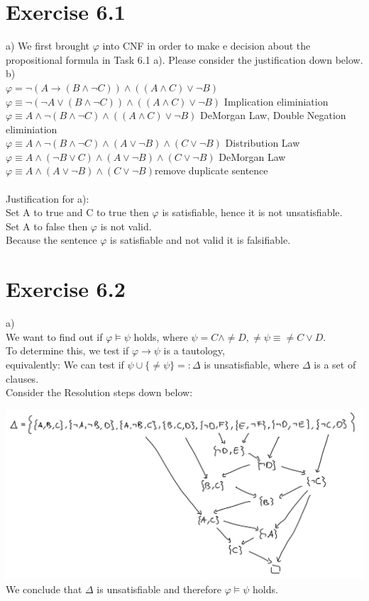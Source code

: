 \documentclass[12pt]{article}
\begin{document}
\section*{Exercise 6.1}
a) We first brought $\varphi$ into CNF in order to make e decision about the propositional formula in Task 6.1 a). Please consider the justification down below.\\
b) \\
$\varphi = \lnot (A \to (B \land \lnot C)) \land ((A \land C ) \lor \lnot B)$\\
$\varphi \equiv \lnot (\lnot A \lor (B \land \lnot C)) \land ((A \land C) \lor \lnot B)$ \qquad Implication eliminiation\\
$\varphi \equiv A \land \lnot (B \land \lnot C) \land ((A \land C) \lor \lnot B)$ \qquad DeMorgan Law, Double Negation eliminiation\\
$\varphi \equiv A \land \lnot (B \land \lnot C) \land (A \lor \lnot B) \land (C \lor \lnot B)$ \qquad Distribution Law\\
$\varphi \equiv A \land (\lnot B \lor C) \land (A \lor \lnot B) \land (C \lor \lnot B)$ \qquad DeMorgan Law\\
$\varphi \equiv A \land (A \lor \lnot B) \land (C \lor \lnot B)$\qquad remove duplicate sentence\\ \\
Justification for a):\\
Set A to true and C to true then $\varphi$ is satisfiable, hence it is not unsatisfiable.\\
Set A to false then $\varphi$ is not valid.\\
Because the sentence $\varphi$ is satisfiable and not valid it is falsifiable.


\section*{Exercise 6.2}
a)\\
We want to find out if $\varphi \vDash \psi$ holds, where $\psi = C \land \neq D, \neq \psi \equiv \neq C \lor D$.\\
To determine this, we test if $\varphi \to \psi$ is a tautology,\\
equivalently: We can test if $\psi \cup \{\neq \psi \} =: \Delta$ is unsatisfiable, where $\Delta$ is a set of clauses.\\
Consider the Resolution steps down below:

\includegraphics[width=\textwidth]{figures/6.2a.png}
We conclude that $\Delta$ is unsatisfiable and therefore $\varphi \vDash \psi$ holds.
\end{document}
